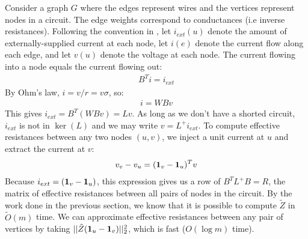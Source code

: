\documentclass{article}
\begin{document}
Consider a graph $G$ where the edges represent wires and the vertices
represent nodes in a circuit. The edge weights correspond to conductances
(i.e inverse resistances). Following the convention in
\cite{SpielmanSrivastava}, let $i_{ext}(u)$ denote the amount of
externally-supplied current at each node, let $i(e)$ denote the current flow
along each edge, and let $v(u)$ denote the voltage at each node. The current
flowing into a node equals the current flowing out:
\begin{align*}
    B^Ti = i_{ext}
\end{align*}
By Ohm's law, $i = v/r = v\sigma$, so:
\begin{align*}
    i = WBv
\end{align*}
This gives $i_{ext} = B^T(WBv) = Lv$. As long as we don't have a shorted
circuit, $i_{ext}$ is not in $\ker(L)$ and we may write $v = L^+i_{ext}$. To
compute effective resistances between any two nodes $(u, v)$, we inject a
unit current at $u$ and extract the current at $v$:
\begin{align*}
    v_v - v_u = (\mathbf{1}_v - \mathbf{1}_u)^Tv
\end{align*}
Because $i_{ext} = (\mathbf{1}_v - \mathbf{1}_u)$, this expression gives us a row of
$B^TL^+B = R$, the matrix of effective resistances between all pairs of
nodes in the circuit. By the work done in the previous section, we know that
it is possible to compute $\tilde{Z}$ in $\tilde{O}(m)$ time. We can
approximate effective resistances between any pair of vertices by taking
$||\tilde{Z}(\mathbf{1}_u -  \mathbf{1}_v)||^2_2$, which is fast ($O(\log m)$ time).



\end{document}
